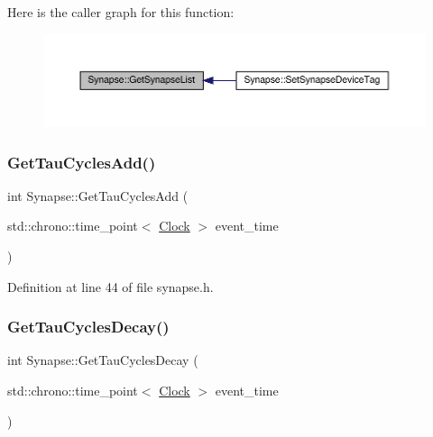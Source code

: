 Here is the caller graph for this function\+:\nopagebreak
\begin{figure}[H]
\begin{center}
\leavevmode
\includegraphics[width=350pt]{class_synapse_a63f214e8ccef1f6625d5fecd36104efe_icgraph}
\end{center}
\end{figure}
\mbox{\label{class_synapse_aeaf2f46a927a4aa7ad982e7da9d630d6}} 
\subsubsection{\texorpdfstring{Get\+Tau\+Cycles\+Add()}{GetTauCyclesAdd()}}
{\footnotesize\ttfamily int Synapse\+::\+Get\+Tau\+Cycles\+Add (\begin{DoxyParamCaption}\item[{std\+::chrono\+::time\+\_\+point$<$ \hyperlink{universe_8h_a0ef8d951d1ca5ab3cfaf7ab4c7a6fd80}{Clock} $>$}]{event\+\_\+time }\end{DoxyParamCaption})\hspace{0.3cm}{\ttfamily [inline]}}



Definition at line 44 of file synapse.\+h.

\mbox{\label{class_synapse_ab56dd60c4bb15a07faef144ec58bcee2}} 
\subsubsection{\texorpdfstring{Get\+Tau\+Cycles\+Decay()}{GetTauCyclesDecay()}}
{\footnotesize\ttfamily int Synapse\+::\+Get\+Tau\+Cycles\+Decay (\begin{DoxyParamCaption}\item[{std\+::chrono\+::time\+\_\+point$<$ \hyperlink{universe_8h_a0ef8d951d1ca5ab3cfaf7ab4c7a6fd80}{Clock} $>$}]{event\+\_\+time }\end{DoxyParamCaption})\hspace{0.3cm}{\ttfamily [inline]}}



